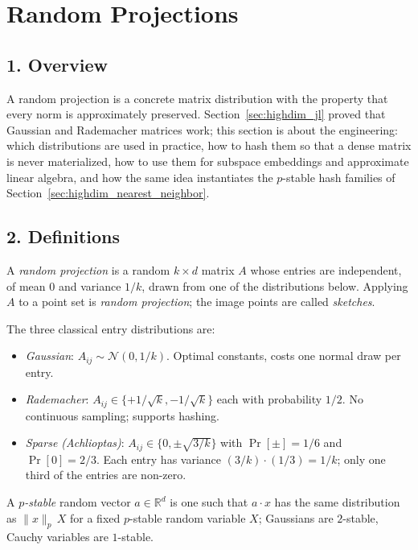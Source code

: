 \section{Random Projections}
\label{sec:highdim_random_projections}

\subsection{1. Overview}

A random projection is a concrete matrix distribution with the property that
every norm is approximately preserved. Section~\ref{sec:highdim_jl} proved
that Gaussian and Rademacher matrices work; this section is about the
engineering: which distributions are used in practice, how to hash them so
that a dense matrix is never materialized, how to use them for
subspace embeddings and approximate linear algebra,
and how the same idea instantiates the $p$-stable hash families of
Section~\ref{sec:highdim_nearest_neighbor}.

\subsection{2. Definitions}

\begin{definition}
\label{def:highdim_random_projection}
A \emph{random projection} is a random $k \times d$ matrix $A$ whose entries
are independent, of mean $0$ and variance $1/k$, drawn from one of the
distributions below. Applying $A$ to a point set is
\emph{random projection}; the image points are called \emph{sketches}.
\end{definition}

The three classical entry distributions are:
\begin{itemize}
\item \emph{Gaussian}: $A_{ij} \sim \mathcal{N}(0, 1/k)$. Optimal constants,
costs one normal draw per entry.
\item \emph{Rademacher}: $A_{ij} \in \{+1/\sqrt{k}, -1/\sqrt{k}\}$ each with
probability $1/2$. No continuous sampling; supports hashing.
\item \emph{Sparse (Achlioptas)}: $A_{ij} \in \{0, \pm \sqrt{3/k}\}$ with
$\Pr[\pm] = 1/6$ and $\Pr[0] = 2/3$. Each entry has variance
$(3/k) \cdot (1/3) = 1/k$; only one third of the entries are non-zero.
\end{itemize}

A \emph{$p$-stable} random vector $a \in \mathbb{R}^d$ is one such that
$a \cdot x$ has the same distribution as $\|x\|_p \, X$ for a fixed
$p$-stable random variable $X$; Gaussians are $2$-stable, Cauchy variables are
$1$-stable.

